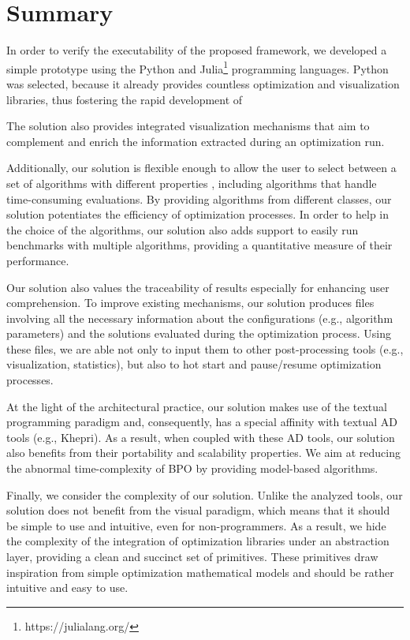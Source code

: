 \section{Summary}


In order to verify the executability of the proposed framework, we developed a simple prototype using the Python and Julia\footnote{https://julialang.org/} programming languages. Python was selected, because it already provides countless optimization and visualization libraries, thus fostering the rapid development of 


The solution also provides integrated visualization mechanisms that aim to complement and enrich the information extracted during an optimization run. 

Additionally, our solution is flexible enough to allow the user to select between a set of algorithms with different properties \cite{Wolpert1997NFLT}, including algorithms that handle time-consuming evaluations. By providing algorithms from different classes, our solution potentiates the efficiency of optimization processes. In order to help in the choice of the algorithms, our solution also adds support to easily run benchmarks with multiple algorithms, providing a quantitative measure of their performance. 

Our solution also values the traceability of results especially for enhancing user comprehension. To improve existing mechanisms, our solution produces files involving all the necessary information about the configurations (e.g., algorithm parameters) and the solutions evaluated during the optimization process. Using these files, we are able not only to input them to other post-processing tools (e.g., visualization, statistics), but also to hot start and pause/resume optimization processes.

At the light of the architectural practice, our solution makes use of the textual programming paradigm and, consequently, has a special affinity with textual \ac{AD} tools (e.g., Khepri). As a result, when coupled with these \ac{AD} tools, our solution also benefits from their portability and scalability properties. We aim at reducing the abnormal time-complexity of \ac{BPO} by providing model-based algorithms. 

Finally, we consider the complexity of our solution. Unlike the analyzed tools, our solution does not benefit from the visual paradigm, which means that it should be simple to use and intuitive, even for non-programmers. As a result, we hide the complexity of the integration of optimization libraries under an abstraction layer, providing a clean and succinct set of primitives. These primitives draw inspiration from simple optimization mathematical models and should be rather intuitive and easy to use. 


